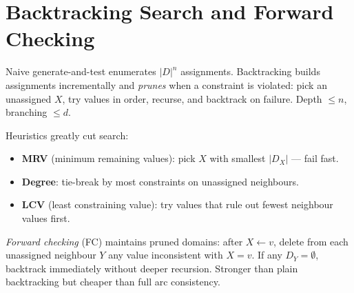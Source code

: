 \section{Backtracking Search and Forward Checking}
\label{sec:backtracking}

Naive generate-and-test enumerates $|D|^n$ assignments. Backtracking builds assignments incrementally and \emph{prunes} when a constraint is violated: pick an unassigned $X$, try values in order, recurse, and backtrack on failure. Depth $\le n$, branching $\le d$.

Heuristics greatly cut search:
\begin{itemize}
    \item \textbf{MRV} (minimum remaining values): pick $X$ with smallest $|D_X|$ --- fail fast.
    \item \textbf{Degree}: tie-break by most constraints on unassigned neighbours.
    \item \textbf{LCV} (least constraining value): try values that rule out fewest neighbour values first.
\end{itemize}

\emph{Forward checking} (FC) maintains pruned domains: after $X\gets v$, delete from each unassigned neighbour $Y$ any value inconsistent with $X=v$. If any $D_Y=\emptyset$, backtrack immediately without deeper recursion. Stronger than plain backtracking but cheaper than full arc consistency.

